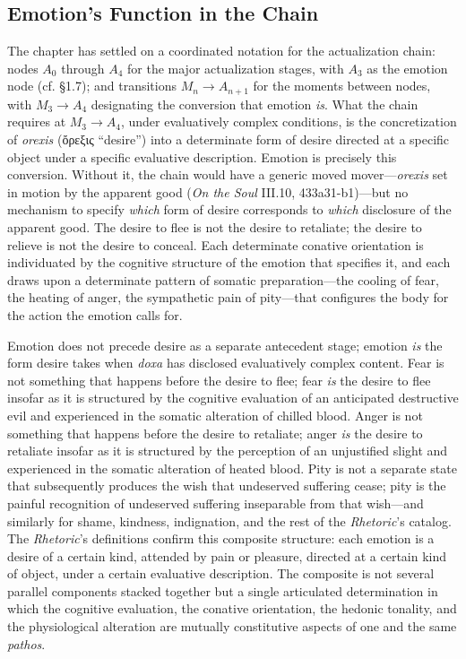 \documentclass{article}
\newcommand{\gk}[1]{{\greekfont #1}}
\begin{document}
\subsection{Emotion's Function in the Chain}

The chapter has settled on a coordinated notation for the actualization chain: nodes $A_0$ through $A_4$ for the major actualization stages, with $A_3$ as the emotion node (cf. \S 1.7); and transitions $M_n \rightarrow A_{n+1}$ for the moments between nodes, with $M_3 \rightarrow A_4$ designating the conversion that emotion \textit{is}. What the chain requires at $M_3 \rightarrow A_4$, under evaluatively complex conditions, is the concretization of \textit{orexis} (\gk{ὄρεξις} ``desire'') into a determinate form of desire directed at a specific object under a specific evaluative description. Emotion is precisely this conversion. Without it, the chain would have a generic moved mover---\textit{orexis} set in motion by the apparent good (\textit{On the Soul} III.10, 433a31-b1)---but no mechanism to specify \textit{which} form of desire corresponds to \textit{which} disclosure of the apparent good. The desire to flee is not the desire to retaliate; the desire to relieve is not the desire to conceal. Each determinate conative orientation is individuated by the cognitive structure of the emotion that specifies it, and each draws upon a determinate pattern of somatic preparation---the cooling of fear, the heating of anger, the sympathetic pain of pity---that configures the body for the action the emotion calls for.

Emotion does not precede desire as a separate antecedent stage; emotion \textit{is} the form desire takes when \textit{doxa} has disclosed evaluatively complex content. Fear is not something that happens before the desire to flee; fear \textit{is} the desire to flee insofar as it is structured by the cognitive evaluation of an anticipated destructive evil and experienced in the somatic alteration of chilled blood. Anger is not something that happens before the desire to retaliate; anger \textit{is} the desire to retaliate insofar as it is structured by the perception of an unjustified slight and experienced in the somatic alteration of heated blood. Pity is not a separate state that subsequently produces the wish that undeserved suffering cease; pity is the painful recognition of undeserved suffering inseparable from that wish---and similarly for shame, kindness, indignation, and the rest of the \textit{Rhetoric}'s catalog. The \textit{Rhetoric}'s definitions confirm this composite structure: each emotion is a desire of a certain kind, attended by pain or pleasure, directed at a certain kind of object, under a certain evaluative description. The composite is not several parallel components stacked together but a single articulated determination in which the cognitive evaluation, the conative orientation, the hedonic tonality, and the physiological alteration are mutually constitutive aspects of one and the same \textit{pathos}. 
\end{document}
